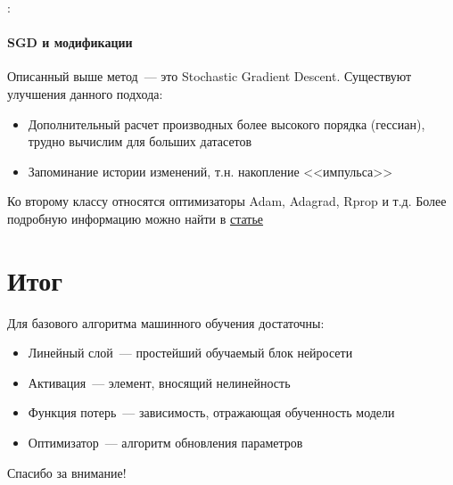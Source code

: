 \documentclass{beamer}
\begin{document}
\begin{frame}{\secname : \subsecname}
  \framesubtitle{SGD и модификации}

  Описанный выше метод~--- это Stochastic Gradient Descent.
  Существуют улучшения данного подхода:
  \begin{itemize}
    \item Дополнительный расчет производных более высокого порядка
      (гессиан), трудно вычислим для больших датасетов
    \item Запоминание истории изменений, т.н. накопление <<импульса>>
  \end{itemize}

  Ко второму классу относятся оптимизаторы Adam, Adagrad, Rprop и
  т.д. Более подробную информацию можно найти в
  \href{https://habr.com/ru/articles/318970/}{статье}
\end{frame}

\section{Итог}

\begin{frame}{\secname}
  Для базового алгоритма машинного обучения достаточны:
  \begin{itemize}
    \item Линейный слой~--- простейший обучаемый блок нейросети
    \item Активация~--- элемент, вносящий нелинейность
    \item Функция потерь~--- зависимость, отражающая обученность модели
    \item Оптимизатор~--- алгоритм обновления параметров
  \end{itemize}
\end{frame}

\begin{frame}
  \begin{center}
    \Huge Спасибо за внимание!
  \end{center}
\end{frame}
\end{document}
